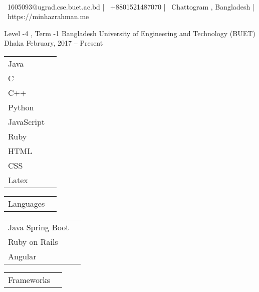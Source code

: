 \documentclass[]{awesome-cv}
\begin{document}
    
\begin{center}
	  \\
	\vspace{2mm}
	{\faEnvelope\ 1605093@ugrad.cse.buet.ac.bd} | {\faMobile\ +8801521487070} | {\faMapMarker\ Chattogram , Bangladesh} | {\faLink\ https://minhazrahman.me}
\end{center}
\begin{cventries}
	\cventry
	{Level -4 , Term -1}
	{Bangladesh University of Engineering and Technology (BUET)}
	{Dhaka}
	{February, 2017 – Present}
	{}
\end{cventries}

\vspace{-2mm}

\begin{cventries}
	\cventry
	{\def\arraystretch{1.15}{\begin{tabular}{ l l }
				Java  & {\skill{ }} \\
				C  & {\skill{ }} \\
				C++  & {\skill{ }} \\
				Python  & {\skill{ }} \\
				JavaScript  & {\skill{ }} \\
				Ruby  & {\skill{ }} \\
				HTML  & {\skill{ }} \\
				CSS  & {\skill{ }} \\
				Latex  & {\skill{ }} \\
	\end{tabular}}}
	{\def\arraystretch{1.15}{\begin{tabular}{ l l }
		Languages  & {\skill{ }} \\
		\end{tabular}}}
	{}
	{}
	{}
	\cventry
	{\def\arraystretch{1.15}{\begin{tabular}{ l l }
				Java Spring Boot  & {\skill{ }} \\
				Ruby on Rails  & {\skill{ }} \\
				Angular  & {\skill{ }} \\
	\end{tabular}}}
	{\def\arraystretch{1.15}{\begin{tabular}{ l l }
				Frameworks  & {\skill{ }} \\
	\end{tabular}}}
	{}
	{}
	{}
\end{cventries}
\end{document}
